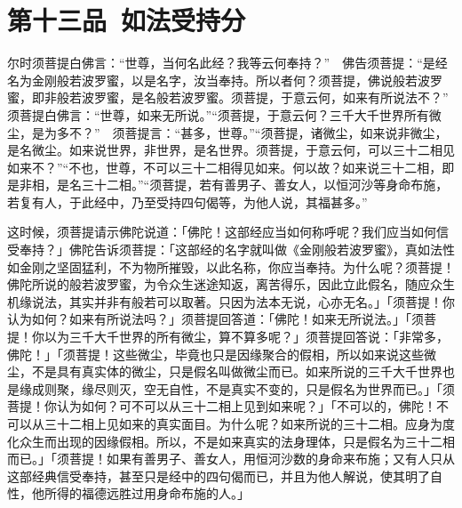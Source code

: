 \documentclass[12pt,twoside,openany]{book}
\newcommand{\kai}[1]{{\CJKfamily{kai}#1}}
\begin{document}
\chapter{第十三品\ 如法受持分}
尔时须菩提白佛言：“世尊，当何名此经？我等云何奉持？”　佛告须菩提：“是经名为金刚般若波罗蜜，以是名字，汝当奉持。所以者何？须菩提，佛说般若波罗蜜，即非般若波罗蜜，是名般若波罗蜜。须菩提，于意云何，如来有所说法不？”　须菩提白佛言：“世尊，如来无所说。”“须菩提，于意云何？三千大千世界所有微尘，是为多不？”　须菩提言：“甚多，世尊。”“须菩提，诸微尘，如来说非微尘，是名微尘。如来说世界，非世界，是名世界。须菩提，于意云何，可以三十二相见如来不？”“不也，世尊，不可以三十二相得见如来。何以故？如来说三十二相，即是非相，是名三十二相。”“须菩提，若有善男子、善女人，以恒河沙等身命布施，若复有人，于此经中，乃至受持四句偈等，为他人说，其福甚多。”

\kai{这时候，须菩提请示佛陀说道：「佛陀！这部经应当如何称呼呢？我们应当如何信受奉持？」佛陀告诉须菩提：「这部经的名字就叫做《金刚般若波罗蜜》，真如法性如金刚之坚固猛利，不为物所摧毁，以此名称，你应当奉持。为什么呢？须菩提！佛陀所说的般若波罗蜜，为令众生迷途知返，离苦得乐，因此立此假名，随应众生机缘说法，其实并非有般若可以取著。只因为法本无说，心亦无名。」「须菩提！你认为如何？如来有所说法吗？」须菩提回答道：「佛陀！如来无所说法。」「须菩提！你以为三千大千世界的所有微尘，算不算多呢？」须菩提回答说：「非常多，佛陀！」「须菩提！这些微尘，毕竟也只是因缘聚合的假相，所以如来说这些微尘，不是具有真实体的微尘，只是假名叫做微尘而已。如来所说的三千大千世界也是缘成则聚，缘尽则灭，空无自性，不是真实不变的，只是假名为世界而已。」「须菩提！你认为如何？可不可以从三十二相上见到如来呢？」「不可以的，佛陀！不可以从三十二相上见如来的真实面目。为什么呢？如来所说的三十二相。应身为度化众生而出现的因缘假相。所以，不是如来真实的法身理体，只是假名为三十二相而已。」「须菩提！如果有善男子、善女人，用恒河沙数的身命来布施；又有人只从这部经典信受奉持，甚至只是经中的四句偈而已，并且为他人解说，使其明了自性，他所得的福德远胜过用身命布施的人。」}
\end{document}
